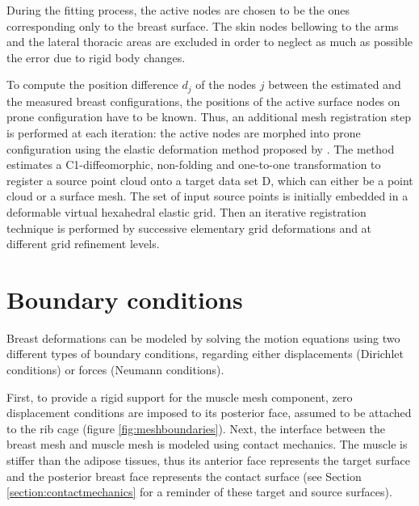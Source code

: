 During the fitting process, the active nodes are chosen to be the ones corresponding only to the breast surface. The skin nodes bellowing to the  arms and the lateral thoracic areas are excluded  in order to neglect as much as possible the error due to rigid body changes.

To compute the position difference $d_j$ of the nodes $j$ between the estimated and the measured breast configurations, the  positions of the active surface nodes on prone configuration have to be known. Thus, an additional mesh registration step is performed at each iteration: the active nodes are morphed into prone configuration using the elastic deformation method proposed by \cite{bucki_fast_2010}. The method estimates a C1-diffeomorphic, non-folding and one-to-one transformation to register a source point cloud onto a target data set D, which can either be a point cloud or a surface mesh.  The set of input source points is initially embedded in a deformable virtual hexahedral elastic grid. Then an iterative registration technique is performed by successive elementary grid deformations and at different grid refinement levels. 


\section{Boundary conditions}\label{section:myBoundayconditions}

Breast deformations can be modeled by solving the
motion equations using two different types of boundary
conditions, regarding either displacements (Dirichlet conditions) or forces (Neumann conditions).

First, to provide a rigid support for the muscle mesh component, zero displacement conditions are imposed to its posterior face, assumed to be attached to the rib cage (figure \ref{fig:meshboundaries}). Next, the interface between the breast mesh and muscle mesh is modeled using contact mechanics. The muscle is stiffer than the adipose tissues, thus its anterior face represents the target surface and the posterior breast face represents the contact surface (see Section \ref{section:contactmechanics} for a reminder of these target and source surfaces). 

